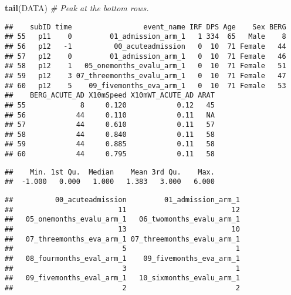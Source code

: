 \documentclass[]{article}
\newenvironment{Shaded}{\begin{snugshade}}{\end{snugshade}}
\newcommand{\KeywordTok}[1]{\textcolor[rgb]{0.13,0.29,0.53}{\textbf{{#1}}}}
\newcommand{\CommentTok}[1]{\textcolor[rgb]{0.56,0.35,0.01}{\textit{{#1}}}}
\newcommand{\NormalTok}[1]{{#1}}
\begin{document}
\begin{Shaded}
\begin{Highlighting}[]
\KeywordTok{tail}\NormalTok{(DATA) }\CommentTok{# Peak at the bottom rows.}
\end{Highlighting}
\end{Shaded}

\begin{verbatim}
##    subID time                 event_name IRF DPS Age    Sex BERG
## 55   p11    0         01_admission_arm_1   1 334  65   Male    8
## 56   p12   -1          00_acuteadmission   0  10  71 Female   44
## 57   p12    0         01_admission_arm_1   0  10  71 Female   46
## 58   p12    1   05_onemonths_evalu_arm_1   0  10  71 Female   51
## 59   p12    3 07_threemonths_evalu_arm_1   0  10  71 Female   47
## 60   p12    5    09_fivemonths_eva_arm_1   0  10  71 Female   53
##    BERG_ACUTE_AD X10mSpeed X10mWT_ACUTE_AD ARAT
## 55             8     0.120            0.12   45
## 56            44     0.110            0.11   NA
## 57            44     0.610            0.11   57
## 58            44     0.840            0.11   58
## 59            44     0.885            0.11   58
## 60            44     0.795            0.11   58
\end{verbatim}

\begin{Shaded}
\end{Shaded}

\begin{verbatim}
##    Min. 1st Qu.  Median    Mean 3rd Qu.    Max. 
##  -1.000   0.000   1.000   1.383   3.000   6.000
\end{verbatim}

\begin{Shaded}
\end{Shaded}

\begin{verbatim}
##          00_acuteadmission         01_admission_arm_1 
##                         11                         12 
##   05_onemonths_evalu_arm_1   06_twomonths_evalu_arm_1 
##                         13                         10 
##   07_threemonths_eva_arm_1 07_threemonths_evalu_arm_1 
##                          5                          1 
##   08_fourmonths_eval_arm_1    09_fivemonths_eva_arm_1 
##                          3                          1 
##   09_fivemonths_eval_arm_1   10_sixmonths_evalu_arm_1 
##                          2                          2
\end{verbatim}
\end{document}
